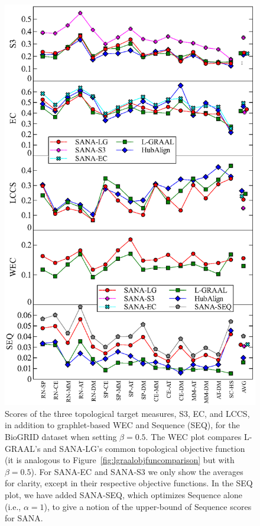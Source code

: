 \documentclass{bioinfo}
\begin{document}
\begin{figure}
\centering
\includegraphics[width=0.99\linewidth]{biogridBeta05.eps}
\caption{Scores of the three topological target measures, S3, EC, and LCCS, in addition to graphlet-based WEC and Sequence (SEQ), for the BioGRID dataset when setting $\beta=0.5$. The WEC plot compares L-GRAAL's and SANA-LG's common topological objective function (it is analogous to Figure~\ref{fig:lgraalobjfuncomparison} but with $\beta=0.5$). For SANA-EC and SANA-S3 we only show the averages for clarity, except in their respective objective functions. In the SEQ plot, we have added SANA-SEQ, which optimizes Sequence alone (i.e., $\alpha=1$), to give a notion of the upper-bound of Sequence scores for SANA.}
\label{fig:biogrid_beta0,5}
\end{figure}
\end{document}
